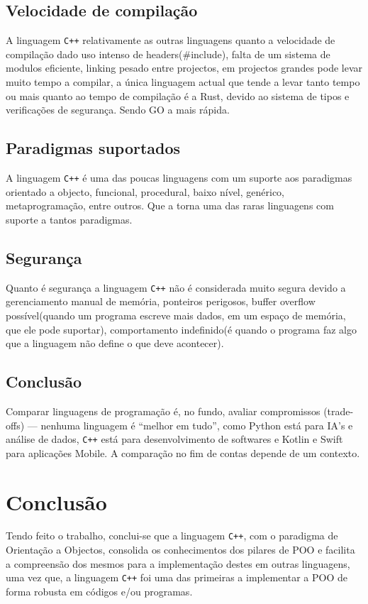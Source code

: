 \documentclass[a4paper,12pt]{article}
\begin{document}
\subsection{Velocidade de compilação}
A linguagem \texttt{C++} relativamente as outras linguagens quanto a velocidade de 
compilação dado uso intenso de headers(\#include), falta de um sistema de modulos eficiente, 
linking pesado entre projectos, em projectos grandes pode levar muito tempo a compilar, a 
única linguagem actual que tende a levar tanto tempo ou mais quanto ao tempo de compilação é a
Rust, devido ao sistema de tipos e verificações de segurança. Sendo GO a mais rápida.

\subsection{Paradigmas suportados}
A linguagem \texttt{C++} é uma das poucas linguagens com um suporte aos paradigmas orientado
 a objecto, funcional, procedural, baixo nível, genérico, metaprogramação, entre outros. Que a torna
 uma das raras linguagens com suporte a tantos paradigmas.

\subsection{Segurança}
Quanto é segurança a linguagem \texttt{C++} não é considerada muito segura devido a gerenciamento manual de memória,
 ponteiros perigosos, buffer overflow possível(quando um programa escreve mais dados, em um espaço de memória, 
 que ele pode suportar), comportamento indefinido(é quando o programa faz algo que a linguagem não define o que deve 
 acontecer).
\subsection{Conclusão}
Comparar linguagens de programação é, no fundo, avaliar compromissos (trade-offs) — 
nenhuma linguagem é “melhor em tudo”, como Python está para IA's e análise de dados, \texttt{C++} está para desenvolvimento de softwares
e Kotlin e Swift para aplicações Mobile. A comparação no fim de contas depende de um contexto.
\newpage
\section{Conclusão}
Tendo feito o trabalho, conclui-se que a linguagem \texttt{C++}, com o paradigma de Orientação a Objectos, consolida os conhecimentos dos pilares de POO e facilita a compreensão dos mesmos para a implementação destes em outras linguagens, uma vez que, a linguagem \texttt{C++} foi uma das primeiras a implementar a POO de forma robusta em códigos e/ou programas.
\newpage
\nocite{*}
\printbibliography[heading=bibintoc]
\end{document}
